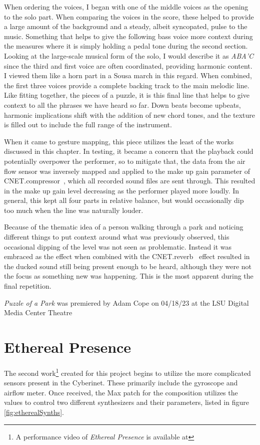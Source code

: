 When ordering the voices, I began with one of the middle voices as the opening to the solo part. When comparing the voices in the score, these helped to provide a large amount of the background and a steady, albeit syncopated, pulse to the music. Something that helps to give the following bass voice more context during the measures where it is simply holding a pedal tone during the second section. Looking at the large-scale musical form of the solo, I would describe it as \emph{ABA'C} since the third and first voice are often coordinated, providing harmonic content. I viewed them like a horn part in a Sousa march in this regard. When combined, the first three voices provide a complete backing track to the main melodic line. Like fitting together, the pieces of a puzzle, it is this final line that helps to give context to all the phrases we have heard so far. Down beats become upbeats, harmonic implications shift with the addition of new chord tones, and the texture is filled out to include the full range of the instrument.

When it came to gesture mapping, this piece utilizes the least of the works discussed in this chapter. In testing, it became a concern that the playback could potentially overpower the performer, so to mitigate that, the data from the air flow sensor was inversely mapped and applied to the make up gain parameter of CNET.compressor~, which all recorded sound files are sent through. This resulted in the make up gain level decreasing as the performer played more loudly. In general, this kept all four parts in relative balance, but would occasionally dip too much when the line was naturally louder.

Because of the thematic idea of a person walking through a park and noticing different things to put context around what was previously observed, this occasional dipping of the level was not seen as problematic. Instead it was embraced as the effect when combined with the CNET.reverb~ effect resulted in the ducked sound still being present enough to be heard, although they were not the focus as something new was happening. This is the most apparent during the final repetition.

\textit{Puzzle of a Park} was premiered by Adam Cope on 04/18/23 at the LSU Digital Media Center Theatre

\section{Ethereal Presence}
The second work\footnote{A performance video of \textit{Ethereal Presence} is available at} created for this project begins to utilize the more complicated sensors present in the Cyberinet. These primarily include the gyroscope and airflow meter. Once received, the Max patch for the composition utilizes the values to control two different synthesizers and their parameters, listed in figure \ref{fig:etherealSynths}. 

